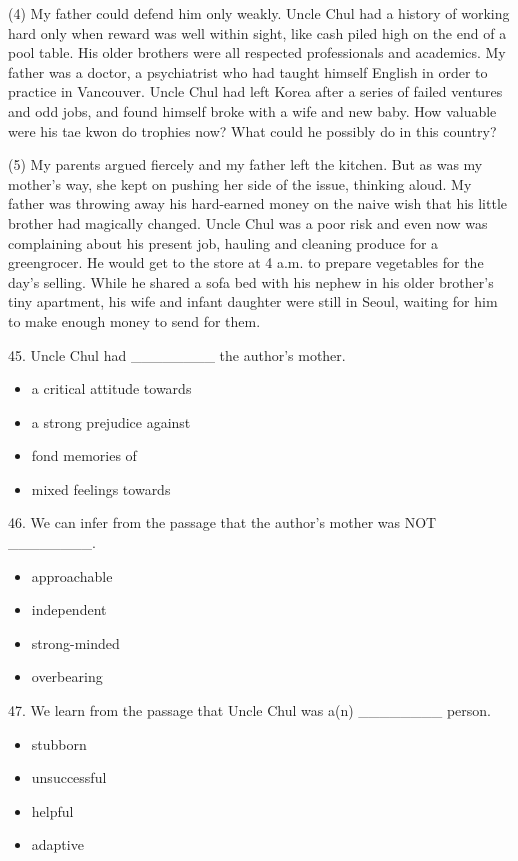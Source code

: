 \documentclass[UTF8,11pt]{ctexart}
\begin{document}
(4) My father could defend him only weakly. Uncle Chul had a history of working hard only when reward was well within sight, like cash piled high on the end of a pool table. His older brothers were all respected professionals and academics. My father was a doctor, a psychiatrist who had taught himself English in order to practice in Vancouver. Uncle Chul had left Korea after a series of failed ventures and odd jobs, and found himself broke with a wife and new baby. How valuable were his tae kwon do trophies now? What could he possibly do in this country?


(5) My parents argued fiercely and my father left the kitchen. But as was my mother’s way, she kept on pushing her side of the issue, thinking aloud. My father was throwing away his hard-earned money on the naive wish that his little brother had magically changed. Uncle Chul was a poor risk and even now was complaining about his present job, hauling and cleaning produce for a greengrocer. He would get to the store at 4 a.m. to prepare vegetables for the day’s selling. While he shared a sofa bed with his nephew in his older brother’s tiny apartment, his wife and infant daughter were still in Seoul, waiting for him to make enough money to send for them.


45. Uncle Chul had \_\_\_\_\_\_\_\_ the author’s mother.


\begin{itemize}[leftmargin=2em,itemsep=.2em,topsep=.4em]\item[A.] a critical attitude towards
\item[B.] a strong prejudice against
\item[C.] fond memories of
\item[D.] mixed feelings towards
\end{itemize}

46. We can infer from the passage that the author’s mother was NOT \_\_\_\_\_\_\_\_.


\begin{itemize}[leftmargin=2em,itemsep=.2em,topsep=.4em]\item[A.] approachable
\item[B.] independent
\item[C.] strong-minded
\item[D.] overbearing
\end{itemize}

47. We learn from the passage that Uncle Chul was a(n) \_\_\_\_\_\_\_\_ person.


\begin{itemize}[leftmargin=2em,itemsep=.2em,topsep=.4em]\item[A.] stubborn
\item[B.] unsuccessful
\item[C.] helpful
\item[D.] adaptive
\end{itemize}
\end{document}
